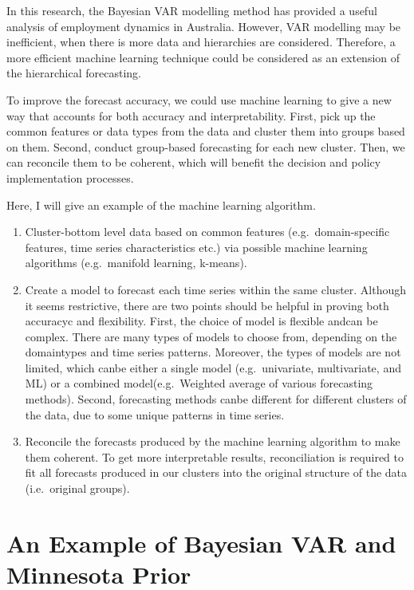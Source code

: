 \documentclass{monashthesis}
\begin{document}
In this research, the Bayesian VAR modelling method has provided a useful analysis of employment dynamics in Australia. However, VAR modelling may be inefficient, when there is more data and hierarchies are considered. Therefore, a more efficient machine learning technique could be considered as an extension of the hierarchical forecasting.

To improve the forecast accuracy, we could use machine learning to give a new way that accounts for both accuracy and interpretability. First, pick up the common features or data types from the data and cluster them into groups based on them. Second, conduct group-based forecasting for each new cluster. Then, we can reconcile them to be coherent, which will benefit the decision and policy implementation processes.

Here, I will give an example of the machine learning algorithm.

\begin{enumerate}
\def\labelenumi{\arabic{enumi}.}
\item
  Cluster-bottom level data based on common features (e.g.~domain-specific features, time series characteristics etc.) via possible machine learning algorithms (e.g.~manifold learning, k-means).
\item
  Create a model to forecast each time series within the same cluster. Although it seems restrictive, there are two points should be helpful in proving both accuracyc and flexibility. First, the choice of model is flexible andcan be complex. There are many types of models to choose from, depending on the domaintypes and time series patterns. Moreover, the types of models are not limited, which canbe either a single model (e.g.~univariate, multivariate, and ML) or a combined model(e.g.~Weighted average of various forecasting methods). Second, forecasting methods canbe different for different clusters of the data, due to some unique patterns in time series.
\item
  Reconcile the forecasts produced by the machine learning algorithm to make them coherent. To get more interpretable results, reconciliation is required to fit all forecasts produced in our clusters into the original structure of the data (i.e.~original groups).
\end{enumerate}

\appendix

\hypertarget{an-example-of-bayesian-var-and-minnesota-prior}{%
\chapter{An Example of Bayesian VAR and Minnesota Prior}\label{an-example-of-bayesian-var-and-minnesota-prior}}
\end{document}
